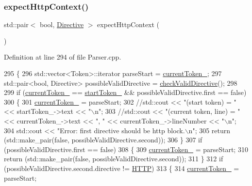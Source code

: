 \subsubsection{\texorpdfstring{expect\+Http\+Context()}{expectHttpContext()}}
{\footnotesize\ttfamily std\+::pair$<$ bool, \hyperlink{classft_1_1_directive}{Directive} $>$ expect\+Http\+Context (\begin{DoxyParamCaption}{ }\end{DoxyParamCaption})\hspace{0.3cm}{\ttfamily [private]}}



Definition at line 294 of file Parser.\+cpp.


\begin{DoxyCode}
295     \{
296         std::vector<Token>::iterator parseStart = \hyperlink{classft_1_1_parser_a942c5b794d108f144c5b5028aaa34cb6}{currentToken\_};
297         std::pair<bool, Directive> possibleValidDirective = \hyperlink{classft_1_1_parser_ad48298d21629daf7c9a31e101bf322ba}{checkValidDirective}();
298 
299         \textcolor{keywordflow}{if} (\hyperlink{classft_1_1_parser_a942c5b794d108f144c5b5028aaa34cb6}{currentToken\_} == \hyperlink{classft_1_1_parser_a85bbb595991c68a1ec2751fabcb8eae5}{startToken\_} && possibleValidDirective.first == \textcolor{keyword}{false}) 
300         \{
301             \hyperlink{classft_1_1_parser_a942c5b794d108f144c5b5028aaa34cb6}{currentToken\_} = parseStart;
302             \textcolor{comment}{//std::cout << "(start token) = " << startToken\_->text << "\(\backslash\)n";}
303             \textcolor{comment}{//std::cout << "(current token, line) = " << currentToken\_->text << ", " <<
       currentToken\_->lineNumber << "\(\backslash\)n";}
304             std::cout << \textcolor{stringliteral}{"Error: first directive should be http block.\(\backslash\)n"};
305             \textcolor{keywordflow}{return} (std::make\_pair(\textcolor{keyword}{false}, possibleValidDirective.second));
306         \}
307         \textcolor{keywordflow}{if} (possibleValidDirective.first == \textcolor{keyword}{false}) 
308         \{
309             \hyperlink{classft_1_1_parser_a942c5b794d108f144c5b5028aaa34cb6}{currentToken\_} = parseStart;
310             \textcolor{keywordflow}{return} (std::make\_pair(\textcolor{keyword}{false}, possibleValidDirective.second));
311         \}
312         \textcolor{keywordflow}{if} (possibleValidDirective.second.directive != \hyperlink{namespaceft_a5a5554dff10f0dc50bae4cc5825ad75da67e044074f46e6cea22788527da5f02e}{HTTP})
313         \{
314             \hyperlink{classft_1_1_parser_a942c5b794d108f144c5b5028aaa34cb6}{currentToken\_} = parseStart;

\end{DoxyCode}
